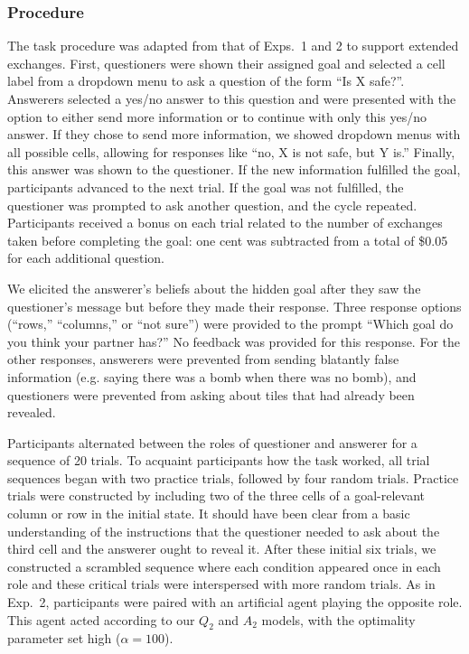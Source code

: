 \documentclass[11pt, floatsintext]{apa6}
\begin{document}
\subsubsection{Procedure}

The task procedure was adapted from that of Exps.~1 and 2 to support extended exchanges. 
First, questioners were shown their assigned goal and selected a cell label from a dropdown menu to ask a question of the form ``Is X safe?''. 
Answerers selected a yes/no answer to this question and were presented with the option to either send more information or to continue with only this yes/no answer.
If they chose to send more information, we showed dropdown menus with all possible cells, allowing for responses like ``no, X is not safe, but Y is.''
Finally, this answer was shown to the questioner.
If the new information fulfilled the goal, participants advanced to the next trial.
If the goal was not fulfilled, the questioner was prompted to ask another question, and the cycle repeated.
Participants received a bonus on each trial related to the number of exchanges taken before completing the goal: one cent was subtracted from a total of \$0.05 for each additional question.%

We elicited the answerer's beliefs about the hidden goal after they saw the questioner's message but before they made their response.
Three response options (``rows,'' ``columns,'' or ``not sure'') were provided to the prompt ``Which goal do you think your partner has?'' 
No feedback was provided for this response.
For the other responses, answerers were prevented from sending blatantly false information (e.g. saying there was a bomb when there was no bomb), and questioners were prevented from asking about tiles that had already been revealed.

Participants alternated between the roles of questioner and answerer for a sequence of 20 trials. 
To acquaint participants how the task worked, all trial sequences began with two practice trials, followed by four random trials.
Practice trials were constructed by including two of the three cells of a goal-relevant column or row in the initial state. 
It should have been clear from a basic understanding of the instructions that the questioner needed to ask about the third cell and the answerer ought to reveal it. 
After these initial six trials, we constructed a scrambled sequence where each condition appeared once in each role and these critical trials were interspersed with more random trials.
As in Exp.~2, participants were paired with an artificial agent playing the opposite role. 
This agent acted according to our $Q_2$ and $A_2$ models, with the optimality parameter set high ($\alpha = 100$). 
\end{document}

